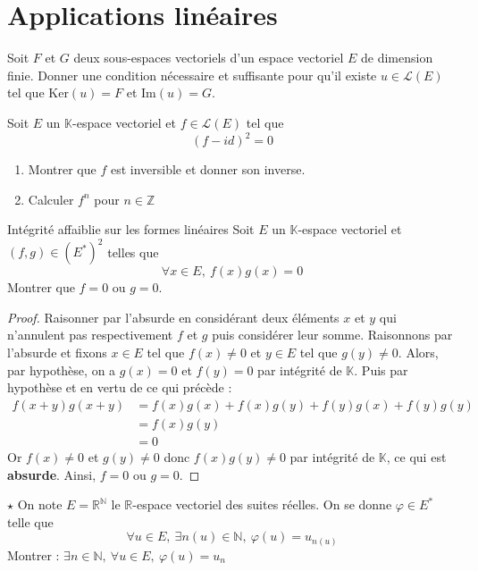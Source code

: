 \documentclass[french,a4paper]{article}
\newcommand{\N}{\mathbb{N}}
\newcommand{\Z}{\mathbb{Z}}
\newcommand{\R}{\mathbb{R}}
\newcommand{\K}{\mathbb{K}}
\newcommand{\st}{^*}
\renewcommand{\ker}{\text{Ker}}
\theoremstyle{plain}
\theoremstyle{definition}
\theoremstyle{remark}
\begin{document}
\section{Applications linéaires}

\begin{ex}[Moulin.EV.32]{}
	Soit $F$ et $G$ deux sous-espaces vectoriels d'un espace vectoriel $E$ de dimension finie. Donner une condition nécessaire et suffisante pour qu'il existe $u\in\mathcal{L}(E)$ tel que $\ker(u)=F$ et $\text{Im}(u)=G$.
\end{ex}

\begin{ex}[Morlot]{}
	Soit $E$ un $\K$-espace vectoriel et $f\in\mathcal{L}(E)$ tel que $$(f-id)^2=0$$ 
	\begin{enumerate}
		\item Montrer que $f$ est inversible et donner son inverse.
		\item Calculer $f^n$ pour $n \in \Z$
	\end{enumerate}
\end{ex}

\begin{ex}[Morlot]{Intégrité affaiblie sur les formes linéaires}
	Soit $E$ un $\K$-espace vectoriel et $(f,g) \in (E\st)^2$ telles que $$\forall x \in E, \ f(x)g(x)=0$$ Montrer que $f=0$ ou $g=0$.
\end{ex}
\begin{proof}
	Raisonner par l'absurde en considérant deux éléments $x$ et $y$ qui n'annulent pas respectivement $f$ et $g$ puis considérer leur somme. Raisonnons par l'absurde et fixons $x \in E$ tel que $f(x)\ne0$ et $y \in E$ tel que $g(y)\ne0$. Alors, par hypothèse, on a $g(x)=0$ et $f(y)=0$ par intégrité de $\K$. Puis par hypothèse et en vertu de ce qui précède :
	\begin{align*}
		f(x+y)g(x+y) & = f(x)g(x)+f(x)g(y)+f(y)g(x)+f(y)g(y) \\
		& =f(x)g(y) \\
		& = 0
	\end{align*}
	Or $f(x)\ne0$ et $g(y)\ne0$ donc $f(x)g(y)\ne0$ par intégrité de $\K$, ce qui est \textbf{absurde}. Ainsi, $f=0$ ou $g=0$.
\end{proof}

\begin{ex}[Morlot]{$\star$}
	On note $E=\R^\N$ le $\R$-espace vectoriel des suites réelles. On se donne $\varphi\in E\st$ telle que $$\forall u\in E,\ \exists n(u)\in \N,\ \varphi(u)=u_{n(u)}$$ Montrer : $\exists n\in\N,\ \forall u\in E,\ \varphi(u)=u_n$
\end{ex}
\end{document}
